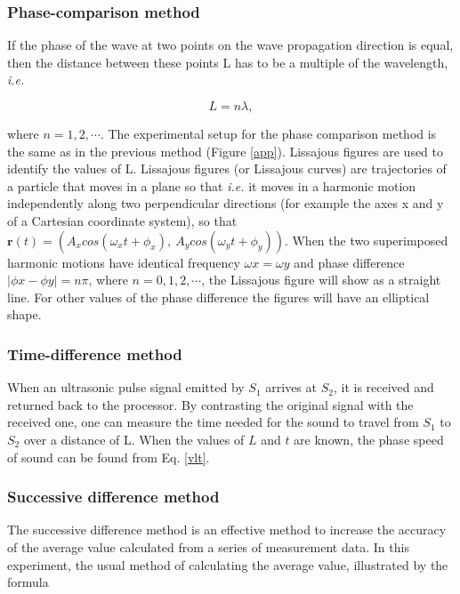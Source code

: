 \subsubsection{Phase-comparison method}

If the phase of the wave at two points on the wave propagation direction is
equal, then the distance between these points L has to be a multiple of the
wavelength, \emph{i.e.} 
    
\[
    L=n\lambda,
\]

where $n=1,2,\cdots$. The experimental setup for the phase comparison method
is the same as in the previous method (Figure \ref{app}). Lissajous figures
are used to identify the values of L. Lissajous figures (or Lissajous
curves) are trajectories of a particle that moves in a plane so that
\emph{i.e.} it moves in a harmonic motion independently along two
perpendicular directions (for example the axes x and y of a Cartesian
coordinate system), so that $\textbf{r}(t) = (A_x cos(\omega_x t + \phi_x
),\ A_y cos(\omega_y t + \phi_y ))$. When the two superimposed harmonic
motions have identical frequency $\omega x = \omega y$ and phase difference
$|\phi x - \phi y | = n\pi$, where $n = 0, 1, 2,\cdots$, the Lissajous
figure will show as a straight line. For other values of the phase
difference the figures will have an elliptical shape.\\ 

\subsubsection{Time-difference method}

When an ultrasonic pulse signal emitted by $S_1$ arrives at $S_2$, it is
received and returned back to the processor. By contrasting the original
signal with the received one, one can measure the time needed for the sound
to travel from $S_1$ to $S_2$ over a distance of L. When the values of $L$
and $t$ are known, the phase speed of sound can be found from Eq.
\ref{vlt}.
    
\subsubsection{Successive difference method}

The successive difference method is an effective method to increase the
accuracy of the average value calculated from a series of measurement data.
In this experiment, the usual method of calculating the average value,
illustrated by the formula 

